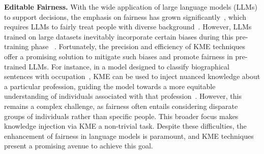 \documentclass[acmsmall, screen]{acmart}
\begin{document}


\vspace{0.05in} \noindent\textsf{\textbf{Editable Fairness.}} With the wide application of large language models (LLMs) to support decisions, the emphasis on fairness has grown significantly~\cite{wang2023large}, which requires LLMs to fairly treat people with diverse background~\cite{abid2021persistent}. However, LLMs trained on large datasets inevitably incorporate certain biases during this pre-training phase ~\cite{dong2019unified}. Fortunately, the precision and efficiency of KME techniques offer a promising solution to mitigate such biases and promote fairness in pre-trained LLMs. For instance, in a model designed to classify biographical sentences with occupation~\cite{de2019bias}, KME can be used to inject nuanced knowledge about a particular profession, guiding the model towards a more equitable understanding of individuals associated with that profession~\cite{hernandez2023measuring}. However, this remains a complex challenge, as fairness often entails considering disparate groups of individuals rather than specific people. This broader focus makes knowledge injection via KME a non-trivial task. Despite these difficulties, the enhancement of fairness in language models is paramount, and KME techniques present a promising avenue to achieve this goal.




\end{document}
